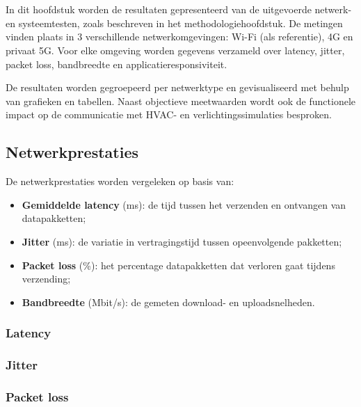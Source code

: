 \chapter{}%
\label{ch:resultaten}

In dit hoofdstuk worden de resultaten gepresenteerd van de uitgevoerde netwerk- en systeemtesten, zoals beschreven in het methodologiehoofdstuk. De metingen vinden plaats in 3 verschillende netwerkomgevingen: Wi-Fi (als referentie), 4G en privaat 5G. Voor elke omgeving worden gegevens verzameld over latency, jitter, packet loss, bandbreedte en applicatieresponsiviteit.

De resultaten worden gegroepeerd per netwerktype en gevisualiseerd met behulp van grafieken en tabellen. Naast objectieve meetwaarden wordt ook de functionele impact op de communicatie met HVAC- en verlichtingssimulaties besproken.

\section{Netwerkprestaties}

De netwerkprestaties worden vergeleken op basis van:

\begin{itemize}
    \item \textbf{Gemiddelde latency} (ms): de tijd tussen het verzenden en ontvangen van datapakketten;
    \item \textbf{Jitter} (ms): de variatie in vertragingstijd tussen opeenvolgende pakketten;
    \item \textbf{Packet loss} (\%): het percentage datapakketten dat verloren gaat tijdens verzending;
    \item \textbf{Bandbreedte} (Mbit/s): de gemeten download- en uploadsnelheden.
\end{itemize}

\subsection{Latency}

\subsection{Jitter}

\subsection{Packet loss}

